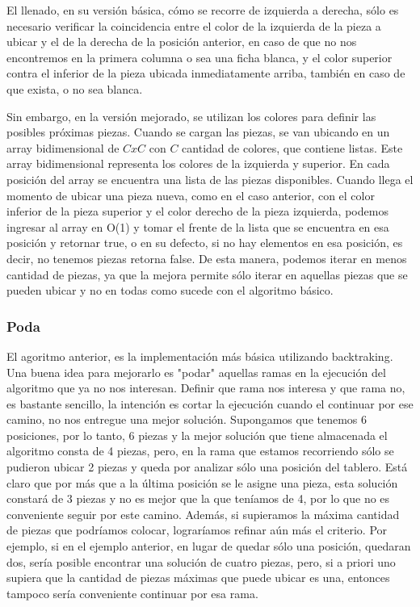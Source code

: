 \documentclass[11pt,a4paper]{article}
\begin{document}
El llenado, en su versión básica, cómo se recorre de izquierda a derecha, sólo es necesario verificar la coincidencia entre el color de la izquierda de la pieza a ubicar y el de la derecha de la posición anterior, en caso de que no nos encontremos en la primera columna o sea una ficha blanca, y el color superior contra el inferior de la pieza ubicada inmediatamente arriba, también en caso de que exista, o no sea blanca.

Sin embargo, en la versión mejorado, se utilizan los colores para definir las posibles próximas piezas. Cuando se cargan las piezas, se van ubicando en un array bidimensional de $CxC$ con $C$ cantidad de colores, que contiene listas. Este array bidimensional representa los colores de la izquierda y superior. En cada posición del array se encuentra una lista de las piezas disponibles. Cuando llega el momento de ubicar una pieza nueva, como en el caso anterior, con el color inferior de la pieza superior y el color derecho de la pieza izquierda, podemos ingresar al array en O(1) y tomar el frente de la lista que se encuentra en esa posición y retornar true, o en su defecto, si no hay elementos en esa posición, es decir, no tenemos piezas retorna false.  De esta manera, podemos iterar en menos cantidad de piezas, ya que la mejora permite sólo iterar en aquellas piezas que se pueden ubicar y no en todas como sucede con el algoritmo básico.

\subsubsection*{Poda}
El agoritmo anterior, es la implementación más básica utilizando backtraking. Una buena idea para mejorarlo es "podar" aquellas ramas en la ejecución del algoritmo que ya no nos interesan. Definir que rama nos interesa y que rama no, es bastante sencillo, la intención es cortar la ejecución cuando el continuar por ese camino, no nos entregue una mejor solución.
Supongamos que tenemos 6 posiciones, por lo tanto, 6 piezas y la mejor solución que tiene almacenada el algoritmo consta de 4 piezas, pero, en la rama que estamos recorriendo sólo se pudieron ubicar 2 piezas y queda por analizar sólo una posición del tablero. Está claro que por más que a la última posición se le asigne una pieza, esta solución constará de 3 piezas y no es mejor que la que teníamos de 4, por lo que no es conveniente seguir por este camino.
Además, si supieramos la máxima cantidad de piezas que podríamos colocar, lograríamos refinar aún más el criterio. Por ejemplo, si en el ejemplo anterior, en lugar de quedar sólo una posición, quedaran dos, sería posible encontrar una solución de cuatro piezas, pero, si a priori uno supiera que la cantidad de piezas máximas que puede ubicar es una, entonces tampoco sería conveniente continuar por esa rama.
\end{document}
